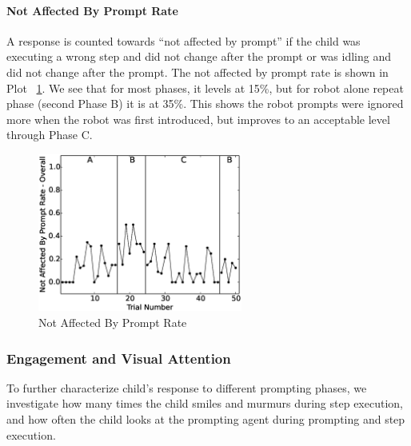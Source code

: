 \paragraph{Not Affected By Prompt Rate}
A response is counted towards ``not affected by prompt'' if the child was executing a wrong step and did not change after the prompt or was idling and did not change after the prompt.  The not affected by prompt rate is shown in Plot \ \ref{fig:99NotAffectedByPromptRate-Overall}.  We see that for most phases, it levels at 15\%, but for robot alone repeat phase (second Phase B) it is at 35\%.  This shows the robot prompts were ignored more when the robot was first introduced, but improves to an acceptable level through Phase C.
\begin{figure} [h]
	\centering
	\includegraphics[width=0.6\textwidth]{./img/data_analysis/99NotAffectedByPromptRate-Overall.eps}
	\caption{Not Affected By Prompt Rate}
	\label{fig:99NotAffectedByPromptRate-Overall}
\end{figure}


\subsubsection{Engagement and Visual Attention}
To further characterize child's response to different prompting phases, we investigate how many times the child smiles and murmurs during step execution, and how often the child looks at the prompting agent during prompting and step execution.

